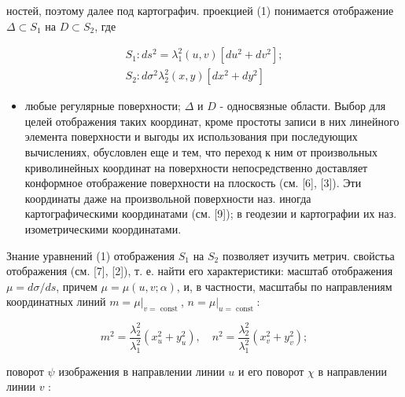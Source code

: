 \documentclass[10pt]{article}
\begin{document}
ностей, поэтому далее под картографич. проекцией (1) понимается отображение $\Delta \subset S_{1}$ на $D \subset S_{2}$, где



\[

\begin{array}{r}

S_{1}: d s^{2}=\lambda_{1}^{2}(u, v)\left[d u^{2}+d v^{2}\right] ; \\

S_{2}: d \sigma^{2} \lambda_{2}^{2}(x, y)\left[d x^{2}+d y^{2}\right]

\end{array}

\]



\begin{itemize}

  \item любые регулярные поверхности; $\Delta$ и $D$ - односвязные области. Выбор для целей отображения таких координат, кроме простоты записи в них линейного элемента поверхности и выгоды их использования при последующих вычислениях, обусловлен еще и тем, что переход к ним от произвольных криволинейных координат на поверхности непосредственно доставляет конформное отображение поверхности на плоскость (см. [6], [3]). Эти координаты даже на произвольной поверхности наз. иногда картографическими координатами (см. [9]); в геодезии и картографии их наз. изометрическими координатами.

\end{itemize}



Знание уравнений (1) отображения $S_{1}$ на $S_{2}$ позволяет изучить метрич. свойстьа отображения (см. [7], [2]), т. е. найти его характеристики: масштаб отображения $\mu=d \sigma / d s$, причем $\mu=\mu(u, v ; \alpha)$, и, в частности, масштабы по направлениям координатных линий $m=\left.\mu\right|_{v=\text { const }}$, $n=\left.\mu\right|_{u=\text { const }}:$



\[

m^{2}=\frac{\lambda_{2}^{2}}{\lambda_{1}^{2}}\left(x_{u}^{2}+y_{u}^{2}\right), \quad n^{2}=\frac{\lambda_{2}^{2}}{\lambda_{1}^{2}}\left(x_{v}^{2}+y_{v}^{2}\right) ;

\]



поворот $\psi$ изображения в направлении линии $u$ и его поворот $\chi$ в направлении линии $v$ :
\end{document}
